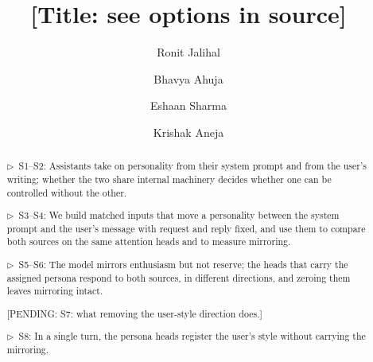 \documentclass[11pt]{article}
\newcommand{\flow}[1]{\par\noindent\textcolor{blue!60!black}{\small$\triangleright$\ #1}\par\medskip}
\newcommand{\pending}[1]{\par\noindent\textcolor{orange!80!black}{\small[PENDING: #1]}\par\medskip}
\begin{document}
\title{\textcolor{orange!80!black}{[Title: see options in source]}}
\author{Ronit Jalihal \and Bhavya Ahuja \and Eshaan Sharma \and Krishak Aneja}
\date{}
\maketitle

\begin{abstract}
\flow{S1--S2: Assistants take on personality from their system prompt and from the user's writing; whether the two share internal machinery decides whether one can be controlled without the other.}
\flow{S3--S4: We build matched inputs that move a personality between the system prompt and the user's message with request and reply fixed, and use them to compare both sources on the same attention heads and to measure mirroring.}
\flow{S5--S6: The model mirrors enthusiasm but not reserve; the heads that carry the assigned persona respond to both sources, in different directions, and zeroing them leaves mirroring intact.}
\pending{S7: what removing the user-style direction does.}
\flow{S8: In a single turn, the persona heads register the user's style without carrying the mirroring.}
\end{abstract}
\end{document}
